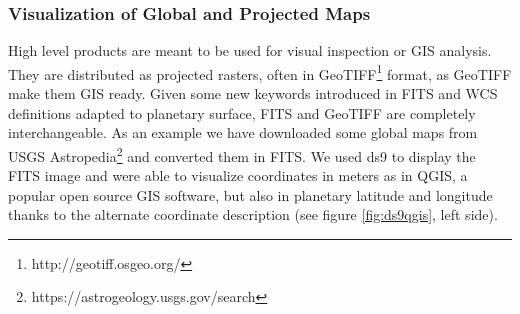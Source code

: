 \subsubsection{Visualization of Global and Projected Maps}
High level products are meant to be used for visual inspection or GIS analysis.
They are distributed as projected rasters, often in GeoTIFF\footnote{http://geotiff.osgeo.org/}
format, as GeoTIFF make them GIS ready.
Given some new keywords introduced in FITS and WCS definitions adapted to planetary surface, FITS
and GeoTIFF are completely interchangeable.
As an example we have downloaded some global maps from USGS
Astropedia\footnote{https://astrogeology.usgs.gov/search} and converted them in FITS.
We used ds9 to display the FITS image and were able to visualize coordinates in meters
as in QGIS, a popular open source GIS software, but also in planetary latitude and longitude
thanks to the alternate coordinate
description (see figure \ref{fig:ds9qgis}, left side).
